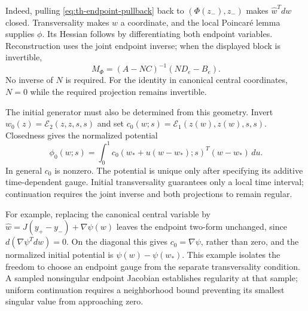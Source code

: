 Indeed, pulling \eqref{eq:th-endpoint-pullback} back to $(\Phi(z_-),z_-)$ makes $\widehat w^Tdw$ closed. Transversality makes $w$ a coordinate, and the local Poincar\'e lemma supplies $\phi$. Its Hessian follows by differentiating both endpoint variables. Reconstruction uses the joint endpoint inverse; when the displayed block is invertible,
\begin{equation}
 M_\Phi=(A-NC)^{-1}(ND_e-B_e).
 \label{eq:th-endpoint-reconstruction}
\end{equation}
No inverse of $N$ is required. For the identity in canonical central coordinates, $N=0$ while the required projection remains invertible.

The initial generator must also be determined from this geometry. Invert $w_0(z)=\mathcal E_2(z,z,s,s)$ and set $c_0(w;s)=\mathcal E_1(z(w),z(w),s,s)$. Closedness gives the normalized potential
\begin{equation}
 \phi_0(w;s)=\int_0^1 c_0(w_*+u(w-w_*);s)^T(w-w_*)\,du .
 \label{eq:th-initial-gauge}
\end{equation}
In general $c_0$ is nonzero. The potential is unique only after specifying its additive time-dependent gauge. Initial transversality guarantees only a local time interval; continuation requires the joint inverse and both projections to remain regular.

For example, replacing the canonical central variable by $\widehat w=J(y_+-y_-)+\nabla\psi(w)$ leaves the endpoint two-form unchanged, since $d(\nabla\psi^Tdw)=0$. On the diagonal this gives $c_0=\nabla\psi$, rather than zero, and the normalized initial potential is $\psi(w)-\psi(w_*)$. This example isolates the freedom to choose an endpoint gauge from the separate transversality condition. A sampled nonsingular endpoint Jacobian establishes regularity at that sample; uniform continuation requires a neighborhood bound preventing its smallest singular value from approaching zero.

